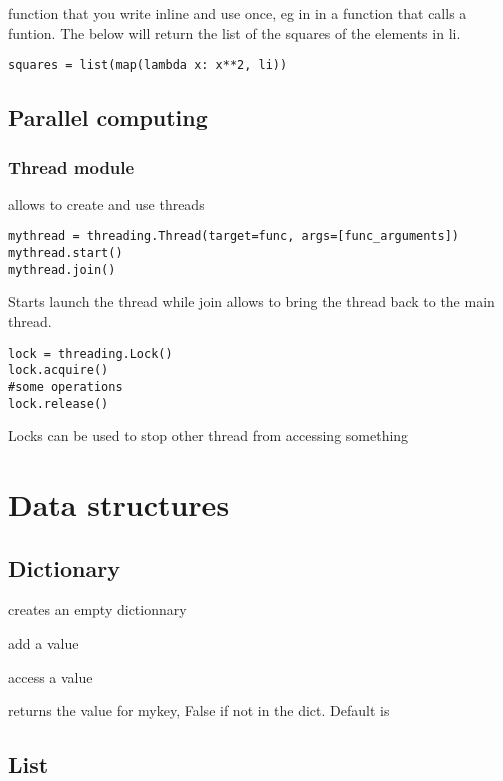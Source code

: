 		function that you write inline and use once, eg in in a function that calls a funtion. The below will return the list of the squares of the elements in li.


\begin{lstlisting}
squares = list(map(lambda x: x**2, li))
\end{lstlisting}


	\subsection{Parallel computing}

		\subsubsection{Thread module}

			 allows to create and use threads

\begin{lstlisting}
mythread = threading.Thread(target=func, args=[func_arguments])
mythread.start()
mythread.join()
\end{lstlisting}

			Starts launch the thread while join allows to bring the thread back to the main thread.

\begin{lstlisting}
lock = threading.Lock()
lock.acquire()
#some operations
lock.release()
\end{lstlisting}

		Locks can be used to stop other thread from accessing something


\section{Data structures}


	\subsection{Dictionary}

		 creates an empty dictionnary

		 add a value

		 access a value

		 returns the value for mykey, False if not in the dict. Default is 

	\subsection{List}

